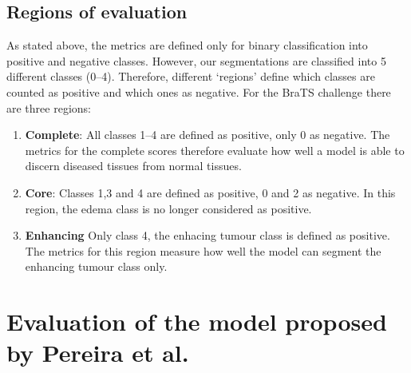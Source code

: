 \documentclass[12pt,a4paper,twoside,openright]{report}
\begin{document}
\subsection{Regions of evaluation}
As stated above, the metrics are defined only for binary classification into positive and negative classes. However, our segmentations are classified into 5 different classes (0--4). Therefore, different `regions' define which classes are counted as positive and which ones as negative. For the BraTS challenge there are three regions:
\begin{enumerate}
	\item \textbf{Complete}: All classes 1--4 are defined as positive, only 0 as negative. The metrics for the complete scores therefore evaluate how well a model is able to discern diseased tissues from normal tissues.
	\item \textbf{Core}: Classes 1,3 and 4 are defined as positive, 0 and 2 as negative. In this region, the edema class is no longer considered as positive.
	\item \textbf{Enhancing} Only class 4, the enhacing tumour class is defined as positive. The metrics for this region measure how well the model can segment the enhancing tumour class only.
\end{enumerate}


\section{Evaluation of the model proposed by Pereira et al.}
\end{document}
